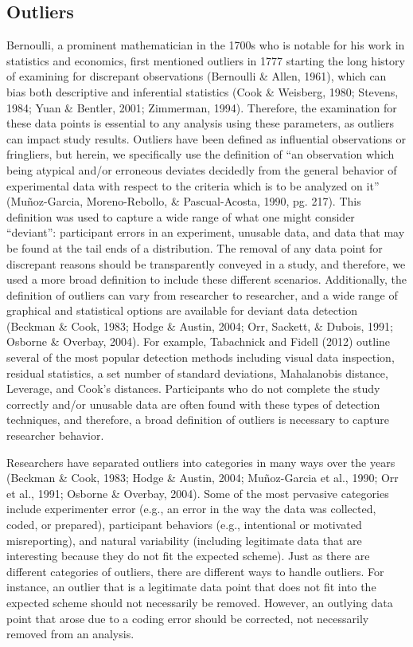 \documentclass[english,,man,mask]{apa6}
\theoremstyle{definition}
\theoremstyle{definition}
\theoremstyle{definition}
\theoremstyle{remark}
\begin{document}
\subsection{Outliers}\label{outliers}

Bernoulli, a prominent mathematician in the 1700s who is notable for his
work in statistics and economics, first mentioned outliers in 1777
starting the long history of examining for discrepant observations
(Bernoulli \& Allen, 1961), which can bias both descriptive and
inferential statistics (Cook \& Weisberg, 1980; Stevens, 1984; Yuan \&
Bentler, 2001; Zimmerman, 1994). Therefore, the examination for these
data points is essential to any analysis using these parameters, as
outliers can impact study results. Outliers have been defined as
influential observations or fringliers, but herein, we specifically use
the definition of \enquote{an observation which being atypical and/or
erroneous deviates decidedly from the general behavior of experimental
data with respect to the criteria which is to be analyzed on it}
(Muñoz-Garcia, Moreno-Rebollo, \& Pascual-Acosta, 1990, pg. 217). This
definition was used to capture a wide range of what one might consider
\enquote{deviant}: participant errors in an experiment, unusable data,
and data that may be found at the tail ends of a distribution. The
removal of any data point for discrepant reasons should be transparently
conveyed in a study, and therefore, we used a more broad definition to
include these different scenarios. Additionally, the definition of
outliers can vary from researcher to researcher, and a wide range of
graphical and statistical options are available for deviant data
detection (Beckman \& Cook, 1983; Hodge \& Austin, 2004; Orr, Sackett,
\& Dubois, 1991; Osborne \& Overbay, 2004). For example, Tabachnick and
Fidell (2012) outline several of the most popular detection methods
including visual data inspection, residual statistics, a set number of
standard deviations, Mahalanobis distance, Leverage, and Cook's
distances. Participants who do not complete the study correctly and/or
unusable data are often found with these types of detection techniques,
and therefore, a broad definition of outliers is necessary to capture
researcher behavior.

Researchers have separated outliers into categories in many ways over
the years (Beckman \& Cook, 1983; Hodge \& Austin, 2004; Muñoz-Garcia et
al., 1990; Orr et al., 1991; Osborne \& Overbay, 2004). Some of the most
pervasive categories include experimenter error (e.g., an error in the
way the data was collected, coded, or prepared), participant behaviors
(e.g., intentional or motivated misreporting), and natural variability
(including legitimate data that are interesting because they do not fit
the expected scheme). Just as there are different categories of
outliers, there are different ways to handle outliers. For instance, an
outlier that is a legitimate data point that does not fit into the
expected scheme should not necessarily be removed. However, an outlying
data point that arose due to a coding error should be corrected, not
necessarily removed from an analysis.
\end{document}
